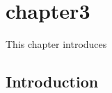 

\chapter{chapter3}
\label{chapter:3}


\begin{Abstract}
This chapter introduces 
\end{Abstract}

\acresetall 

\section{Introduction}
